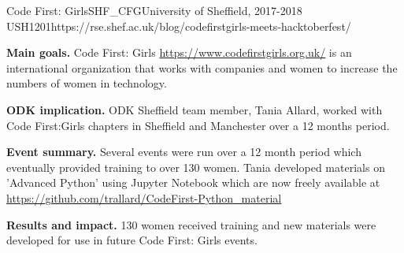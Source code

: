 \begin{event}{Code First: Girls}{SHF_CFG}{University of Sheffield, 2017-2018 }{USH}{120}{1}{https://rse.shef.ac.uk/blog/codefirstgirls-meets-hacktoberfest/}

\textbf{Main goals.} Code First: Girls \url{https://www.codefirstgirls.org.uk/} is an international organization that works with companies and women to increase the numbers of women in technology.

\textbf{ODK implication.} ODK Sheffield team member, Tania Allard, worked with Code First:Girls chapters in Sheffield and Manchester over a 12 months period.

\textbf{Event summary.} Several events were run over a 12 month period which eventually provided training to over 130 women.  Tania developed materials on 'Advanced Python' using Jupyter Notebook which are now freely available at \url{https://github.com/trallard/CodeFirst-Python_material}

\textbf{Results and impact.} 130 women received training and new materials were developed for use in future Code First: Girls events.

\end{event}

